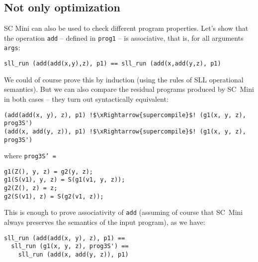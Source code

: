 \subsection{Not only optimization}

% 

%

SC Mini can also be used to check different program properties.
Let's show that the operation \texttt{add} -- defined in \texttt{prog1} --
is associative, that is, for all arguments \texttt{args}:
\begin{lstlisting}
sll_run (add(add(x,y),z), p1) == sll_run (add(x,add(y,z), p1)
\end{lstlisting}
We could of course prove this by induction (using the rules of SLL operational semantics).
But we can also compare the residual programs produced by SC~Mini in both cases --
they turn out syntactically equivalent:
\begin{lstlisting}[language=sll,escapechar=!]
(add(add(x, y), z), p1) !$\xRightarrow{supercompile}$! (g1(x, y, z), prog3S')
(add(x, add(y, z)), p1) !$\xRightarrow{supercompile}$! (g1(x, y, z), prog3S')
\end{lstlisting}
where \texttt{prog3S' =}
\begin{lstlisting}[language=sll]
g1(Z(), y, z) = g2(y, z);
g1(S(v1), y, z) = S(g1(v1, y, z));
g2(Z(), z) = z;
g2(S(v1), z) = S(g2(v1, z));
\end{lstlisting}
This is enough to prove associativity of \texttt{add} (assuming of course
that SC~Mini always preserves the semantics of the input program), as we have:
\begin{lstlisting}
sll_run (add(add(x, y), z), p1) ==
  sll_run (g1(x, y, z), prog3S') ==
    sll_run (add(x, add(y, z)), p1)
\end{lstlisting}
